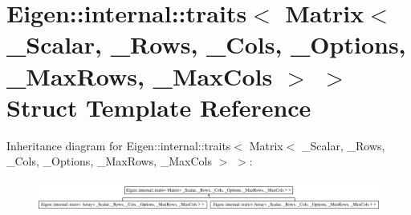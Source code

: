 \hypertarget{struct_eigen_1_1internal_1_1traits_3_01_matrix_3_01___scalar_00_01___rows_00_01___cols_00_01___o4c9772ffb3eee7280611af9a479b3583}{}\section{Eigen\+:\+:internal\+:\+:traits$<$ Matrix$<$ \+\_\+\+Scalar, \+\_\+\+Rows, \+\_\+\+Cols, \+\_\+\+Options, \+\_\+\+Max\+Rows, \+\_\+\+Max\+Cols $>$ $>$ Struct Template Reference}
\label{struct_eigen_1_1internal_1_1traits_3_01_matrix_3_01___scalar_00_01___rows_00_01___cols_00_01___o4c9772ffb3eee7280611af9a479b3583}
Inheritance diagram for Eigen\+:\+:internal\+:\+:traits$<$ Matrix$<$ \+\_\+\+Scalar, \+\_\+\+Rows, \+\_\+\+Cols, \+\_\+\+Options, \+\_\+\+Max\+Rows, \+\_\+\+Max\+Cols $>$ $>$\+:\begin{figure}[H]
\begin{center}
\leavevmode
\includegraphics[height=1.035120cm]{struct_eigen_1_1internal_1_1traits_3_01_matrix_3_01___scalar_00_01___rows_00_01___cols_00_01___o4c9772ffb3eee7280611af9a479b3583}
\end{center}
\end{figure}
